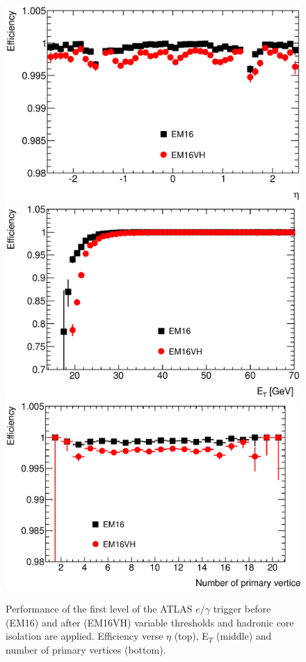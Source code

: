 		\begin{figure}[h]
			\centering
				\includegraphics[width=0.78\linewidth]{images/L1_EM16VH_TandP_eff_vs_eta.eps}
				\includegraphics[width=0.78\linewidth]{images/L1_EM16VH_TandP_eff_vs_Et.eps}
				\includegraphics[width=0.78\linewidth]{images/L1_EM16VH_TandP_eff_vs_pvx.eps}
			\caption{Performance of the first level of the ATLAS $e/\gamma$ trigger before (EM16) and after (EM16VH) variable thresholds and hadronic core isolation are applied. Efficiency verse $\eta$ (top), E$_{T}$ (middle) and number of primary vertices (bottom).}
			\label{fig:L1}
		\end{figure}


